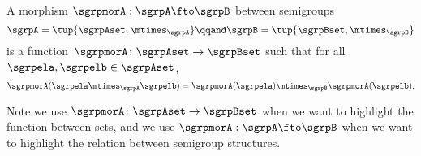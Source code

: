 

\section{\wHomos}

\begin{ctdefinition}
  \label{def:semigroup-mor}
   A morphism $\sgrpmorA: \sgrpA \fto \sgrpB$ between semigroups
  \begin{equation}
  \sgrpA = \tup{\sgrpAset, \mtimes_\sgrpA}
   \qqand
   \sgrpB = \tup{\sgrpBset, \mtimes_\sgrpB}
   \end{equation}
     is a function~$\sgrpmorA\colon \sgrpAset \to \sgrpBset$
      such that for all $\sgrpela, \sgrpelb \in \sgrpAset$,
  \begin{equation}
    \label{eq:sgrp-mor-comp}
    \sgrpmorA(\sgrpela \mtimes_{\sgrpA} \sgrpelb) = \sgrpmorA (\sgrpela) \mtimes_{\sgrpB} \sgrpmorA(\sgrpelb).
  \end{equation}
\end{ctdefinition}
 Note we use $\sgrpmorA\colon \sgrpAset \to \sgrpBset$ when we want to highlight
 the function between sets, and we use
 $\sgrpmorA: \sgrpA \fto \sgrpB$
 when we want to highlight the relation between semigroup structures.


